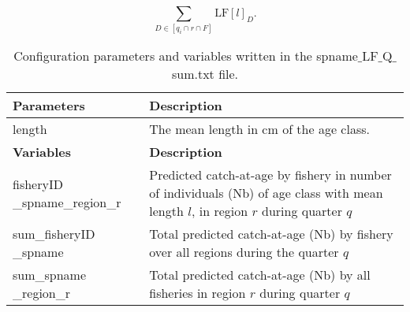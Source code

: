 \begin{equation*}
    \sum_{D\in\left[q_{i}\cap r\cap F\right]}\text{LF}\left[l\right]_{D}.
\end{equation*}

\begin{center}
\begin{table}[H]
\caption{Configuration parameters and variables written in the {\ttfamily spname$\_$LF$\_$Q$\_$sum.txt} file.}
\begin{tabular}{p{4cm}p{11.75cm}}
    \hline
    {\bfseries Parameters} & {\bfseries Description}\\ \hline\hline
    {\ttfamily length} & The mean length in cm of the age class. \\ \hline
    {\bfseries Variables} & {\bfseries Description}\\ \hline\hline
    {\ttfamily fisheryID} {\ttfamily \_spname}{\ttfamily \_region\_r} & Predicted catch-at-age by fishery in number of individuals (Nb) of age class with mean length $l$, in region $r$ during quarter $q$ \\ \hline
    {\ttfamily sum\_fisheryID} {\ttfamily \_spname} & Total predicted catch-at-age (Nb) by fishery over all regions during the quarter $q$ \\ \hline
    {\ttfamily sum\_spname} {\ttfamily \_region\_r}  & Total predicted catch-at-age (Nb) by all fisheries in region $r$ during quarter $q$\\
   \hline
\end{tabular}
\label{fig:sumQLFfishery}
\end{table}
\end{center}
